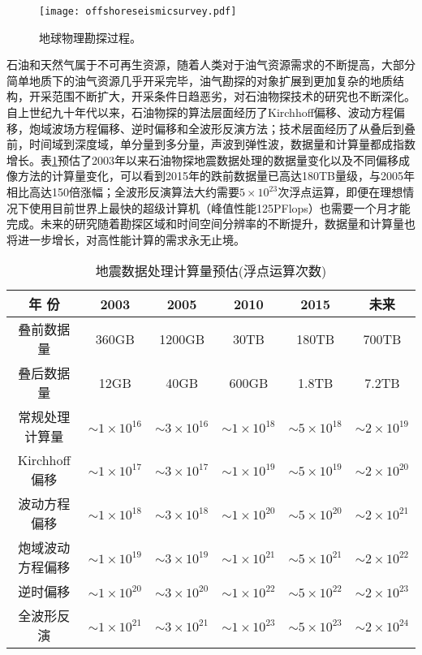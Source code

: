 \begin{figure}[t]
  \centering
  \texttt{[image: offshoreseismicsurvey.pdf]}
  \caption{地球物理勘探过程。}
  \label{fig:offshoreseismicsurvey}
\end{figure}

石油和天然气属于不可再生资源，随着人类对于油气资源需求的不断提高，大部分简单地质下的油气资源几乎开采完毕，油气勘探的对象扩展到更加复杂的地质结构，开采范围不断扩大，开采条件日趋恶劣，对石油物探技术的研究也不断深化。自上世纪九十年代以来，石油物探的算法层面经历了Kirchhoff偏移\cite{yilmaz2001seismic}、波动方程偏移\cite{rickett2002offset}，炮域波场方程偏移\cite{zhang2005theory}、逆时偏移\cite{baysal1983reverse}和全波形反演方法\cite{tarantola1984inversion}；技术层面经历了从叠后到叠前，时间域到深度域，单分量到多分量，声波到弹性波，数据量和计算量都成指数增长\cite{赵改善2009高性能计算在石油物探中的应用现状与前景}。表\ref{tb:oilcomputing}预估了2003年以来石油物探地震数据处理的数据量变化以及不同偏移成像方法的计算量变化\cite{赵改善2009高性能计算在石油物探中的应用现状与前景}，可以看到2015年的跌前数据量已高达180TB量级，与2005年相比高达150倍涨幅；全波形反演算法大约需要$5\times10^{23}$次浮点运算，即便在理想情况下使用目前世界上最快的超级计算机（峰值性能125PFlops）也需要一个月才能完成。未来的研究随着勘探区域和时间空间分辨率的不断提升，数据量和计算量也将进一步增长，对高性能计算的需求永无止境。

\begin{table}[ht]
\centering
\caption{地震数据处理计算量预估(浮点运算次数)}
\label{tb:oilcomputing}
\begin{tabular}{cccccc}
\hline\hline
年    份      & 2003         & 2005         & 2010         & 2015         & 未来           \\ \hline
叠前数据量       & 360GB        & 1200GB       & 30TB         & 180TB        & 700TB        \\ \hline
叠后数据量       & 12GB         & 40GB         & 600GB        & 1.8TB        & 7.2TB        \\ \hline
常规处理计算量   & $\sim1\times10^{16}$ & $\sim3\times10^{16}$ & $\sim1\times10^{18}$ & $\sim5\times10^{18}$ & $\sim2\times10^{19}$ \\ \hline
Kirchhoff偏移    & $\sim1\times10^{17}$ & $\sim3\times10^{17}$ & $\sim1\times10^{19}$ & $\sim5\times10^{19}$ & $\sim2\times10^{20}$ \\ \hline
波动方程偏移     & $\sim1\times10^{18}$ & $\sim3\times10^{18}$ & $\sim1\times10^{20}$ & $\sim5\times10^{20}$ & $\sim2\times10^{21}$ \\ \hline
炮域波动方程偏移 & $\sim1\times10^{19}$ & $\sim3\times10^{19}$ & $\sim1\times10^{21}$ & $\sim5\times10^{21}$ & $\sim2\times10^{22}$ \\ \hline
逆时偏移         & $\sim1\times10^{20}$ & $\sim3\times10^{20}$ & $\sim1\times10^{22}$ & $\sim5\times10^{22}$ & $\sim2\times10^{23}$ \\ \hline
全波形反演       & $\sim1\times10^{21}$ & $\sim3\times10^{21}$ & $\sim1\times10^{23}$ & $\sim5\times10^{23}$ & $\sim2\times10^{24}$ \\ \hline
\hline
\end{tabular}
\end{table}

